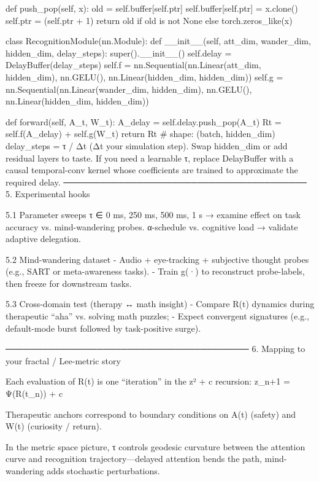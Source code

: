     def push_pop(self, x):
        old = self.buffer[self.ptr]
        self.buffer[self.ptr] = x.clone()
        self.ptr = (self.ptr + 1) %
        return old if old is not None else torch.zeros_like(x)

class RecognitionModule(nn.Module):
    def __init__(self, att_dim, wander_dim, hidden_dim, delay_steps):
        super().__init__()
        self.delay = DelayBuffer(delay_steps)
        self.f = nn.Sequential(nn.Linear(att_dim, hidden_dim),
                               nn.GELU(),
                               nn.Linear(hidden_dim, hidden_dim))
        self.g = nn.Sequential(nn.Linear(wander_dim, hidden_dim),
                               nn.GELU(),
                               nn.Linear(hidden_dim, hidden_dim))

    def forward(self, A_t, W_t):
        A_delay = self.delay.push_pop(A_t)
        Rt = self.f(A_delay) + self.g(W_t)
        return Rt                    # shape: (batch, hidden_dim)
delay_steps = τ / Δt (Δt your simulation step).
Swap hidden_dim or add residual layers to taste.
If you need a learnable τ, replace DelayBuffer with a causal temporal-conv kernel whose coefficients are trained to approximate the required delay.
────────────────────────────────────────
5.  Experimental hooks

5.1  Parameter sweeps
  τ ∈ {0 ms, 250 ms, 500 ms, 1 s} → examine effect on task accuracy vs. mind-wandering probes.
  α-schedule vs. cognitive load → validate adaptive delegation.

5.2  Mind-wandering dataset
  -  Audio + eye-tracking + subjective thought probes (e.g., SART or meta-awareness tasks).
  -  Train g(·) to reconstruct probe-labels, then freeze for downstream tasks.

5.3  Cross-domain test (therapy ↔ math insight)
  -  Compare R(t) dynamics during therapeutic “aha” vs. solving math puzzles;
  -  Expect convergent signatures (e.g., default-mode burst followed by task-positive surge).

────────────────────────────────────────
6.  Mapping to your fractal / Lee-metric story

Each evaluation of R(t) is one “iteration” in the z² + c recursion:
 z_{n+1} = Ψ(R(t_n)) + c

Therapeutic anchors correspond to boundary conditions on A(t) (safety) and W(t) (curiosity / return).

In the metric space picture, τ controls geodesic curvature between the attention curve and recognition trajectory—delayed attention bends the path, mind-wandering adds stochastic perturbations.


